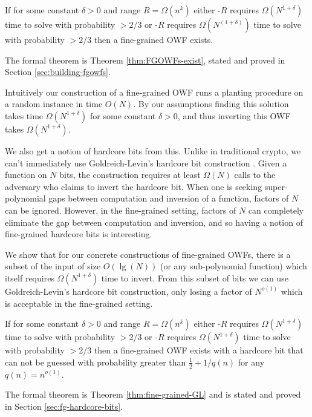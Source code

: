 \begin{theorem}
	If for some constant $\delta>0$ and range $R = \Omega(n^k)$ either \kSum-$R$ requires $\Omega(N^{1+\delta})$ time to solve with probability $>2/3$ or \zkclique-$R$ requires $\Omega(N^{(1+\delta)})$ time to solve with probability $>2/3$  then a fine-grained OWF exists.
\end{theorem}
The formal theorem is Theorem \ref{thm:FGOWFs-exist}, stated and proved in Section \ref{sec:building-fgowfs}.

Intuitively our construction of a fine-grained OWF runs a planting procedure on a random instance in time $O(N)$. By our assumptions finding this solution takes time $\Omega(N^{1+\delta})$ for some constant $\delta > 0$, and thus inverting this OWF takes $\Omega(N^{1+\delta})$.

We also get a notion of hardcore bits from this. Unlike in traditional crypto, we can't immediately use Goldreich-Levin's hardcore bit construction \cite{hardCoreBitsAndXorLemmaFromGL}. Given a function on $N$ bits, the construction requires at least $\Omega(N)$ calls to the adversary who claims to invert the hardcore bit. When one is seeking super-polynomial gaps between computation and inversion of a function, factors of $N$ can be ignored. However, in the fine-grained setting, factors of $N$ can completely eliminate the gap between computation and inversion, and so having a notion of fine-grained hardcore bits is interesting.

We show that for our concrete constructions of fine-grained OWFs, there is a subset of the input of size $O(\lg(N))$ (or any sub-polynomial function) which itself requires $\Omega(N^{1+\delta})$ time to invert. From this subset of bits we can use Goldreich-Levin's hardcore bit construction, only losing a factor of $N^{o(1)}$ which is acceptable in the fine-grained setting.

\begin{theorem}
	If for some constant $\delta>0$ and range $R = \Omega(n^k)$ either \kSum-$R$ requires $\Omega(N^{1+\delta})$ time to solve with probability $>2/3$ or \zkclique-$R$ requires $\Omega(N^{1+\delta})$ time to solve with probability $>2/3$  then a fine-grained OWF exists with a hardcore bit that can not be guessed with probability greater than $\frac 1 2 +1/q(n)$ for any $q(n) = n^{o(1)}$.
\end{theorem}
The formal theorem is Theorem \ref{thm:fine-grained-GL} and is stated and proved in Section \ref{sec:fg-hardcore-bits}.

